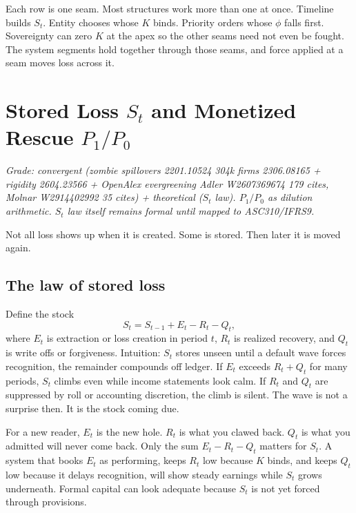 \documentclass[11pt]{article}
\begin{document}
Each row is one seam. Most structures work more than one at once. Timeline builds $S_t$. Entity chooses whose $K$ binds. Priority orders whose $\phi$ falls first. Sovereignty can zero $K$ at the apex so the other seams need not even be fought. The system segments hold together through those seams, and force applied at a seam moves loss across it.

\section{Stored Loss \texorpdfstring{$S_t$}{St} and Monetized Rescue \texorpdfstring{$P_1/P_0$}{P1/P0}}
\label{sec:storedloss}

\textit{Grade: convergent (zombie spillovers 2201.10524 304k firms 2306.08165 + rigidity 2604.23566 + OpenAlex evergreening Adler W2607369674 179 cites, Molnar W2914402992 35 cites) + theoretical ($S_t$ law). $P_1/P_0$ as dilution arithmetic. $S_t$ law itself remains formal until mapped to ASC310/IFRS9.}

Not all loss shows up when it is created. Some is stored. Then later it is moved again.

\subsection{The law of stored loss}

Define the stock
\begin{equation}
S_t = S_{t-1} + E_t - R_t - Q_t,
\label{eq:St}
\end{equation}
where $E_t$ is extraction or loss creation in period $t$, $R_t$ is realized recovery, and $Q_t$ is write offs or forgiveness. Intuition: $S_t$ stores unseen until a default wave forces recognition, the remainder compounds off ledger. If $E_t$ exceeds $R_t+Q_t$ for many periods, $S_t$ climbs even while income statements look calm. If $R_t$ and $Q_t$ are suppressed by roll or accounting discretion, the climb is silent. The wave is not a surprise then. It is the stock coming due.

For a new reader, $E_t$ is the new hole. $R_t$ is what you clawed back. $Q_t$ is what you admitted will never come back. Only the sum $E_t-R_t-Q_t$ matters for $S_t$. A system that books $E_t$ as performing, keeps $R_t$ low because $K$ binds, and keeps $Q_t$ low because it delays recognition, will show steady earnings while $S_t$ grows underneath. Formal capital can look adequate because $S_t$ is not yet forced through provisions.
\end{document}
